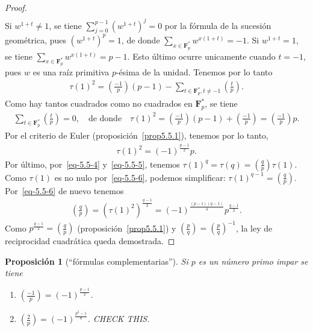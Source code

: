 \documentclass[oneside,bibtotoc,leqno,spanish]{amsbook}
\newcommand{\FF}{\mathbf{F}}
\newcommand{\leg}[2]{\left(\frac{#1}{#2}\right)}
\numberwithin{equation}{section}
\theoremstyle{defi}
\theoremstyle{note}
\newtheorem{proposition}{Proposici\'on}
\theoremstyle{rem}
\numberwithin{theorem}{section}
\numberwithin{proposition}{section}
\numberwithin{definition}{section}
\numberwithin{lemma}{section}
\numberwithin{corollary}{section}
\numberwithin{example}{section}
\numberwithin{footnote}{section}%
\begin{document}
\begin{proof}
\begin{gather*}
\end{gather*}
Si $w^{1+t}\neq 1$, se tiene $\sum_{j=0}^{p-1}(w^{1+t})^{j}=0$ por la f\'ormula de la sucesi\'on geom\'etrica,
pues $(w^{1+t})^{p}=1$, de donde $\sum_{x\in\FF_{p}^{*}}w^{x(1+t)}=-1$. Si $w^{1+t}=1$, se tiene
$\sum_{x\in\FF_{p}^{*}}w^{x(1+t)}=p-1$. Esto \'ultimo ocurre unicamente cuando $t=-1$, pues
$w$ es una ra\'iz primitiva $p$-\'esima de la unidad. Tenemos por lo tanto
\begin{gather*}
\tau(1)^{2}=\leg{-1}{p}(p-1)-\sum_{t\in\FF_{p}^{*}, t\neq -1}\leg{t}{p}.
\end{gather*}
Como hay tantos cuadrados como no cuadrados en $\FF_{p}^{*}$, se tiene
\begin{gather*}
\sum_{t\in\FF_{p}^{*}}\leg{t}{p}=0,\quad\text{de donde}\quad\tau(1)^{2}=\leg{-1}{p}(p-1)+\leg{-1}{p}=\leg{-1}{p}p.
\end{gather*}
Por el criterio de Euler (proposici\'on~\ref{prop5.5.1}), tenemos por lo tanto,
\begin{gather}\label{eq-5.5-6}
\tau(1)^{2}=(-1)^{\frac{p-1}{2}}p.
\end{gather}
Por \'ultimo, por~\eqref{eq-5.5-4} y~\eqref{eq-5.5-5}, tenemos $\tau(1)^{q}=\tau(q)=\leg{q}{p}\tau(1)$. Como
$\tau(1)$ es no nulo por~\eqref{eq-5.5-6}, podemos simplificar: $\tau(1)^{q-1}=\leg{q}{p}$. Por~\eqref{eq-5.5-6}
de nuevo tenemos
\begin{gather*}
\leg{q}{p}=(\tau(1)^{2})^{\frac{q-1}{2}}=(-1)^{\frac{(p-1)(q-1)}{4}}p^{\frac{q-1}{2}}.
\end{gather*}
Como $p^{\frac{q-1}{2}}=\leg{q}{p}$ (proposici\'on~\ref{prop5.5.1})
y $\leg{p}{q} = \leg{p}{q}^{-1}$, la ley de reciprocidad
cuadr\'atica queda demostrada.
\end{proof}

\begin{proposition}[``f\'ormulas complementarias'']\label{prop5.5.2}
Si $p$ es un n\'umero primo impar se tiene
\begin{enumerate}
\item $\leg{-1}{p}=(-1)^{\frac{p-1}{2}}$.
\item $\leg{2}{p} = (-1)^{\frac{p^{2}-1}{8}}$. CHECK THIS.
\end{enumerate}
\end{proposition}
\end{document}
